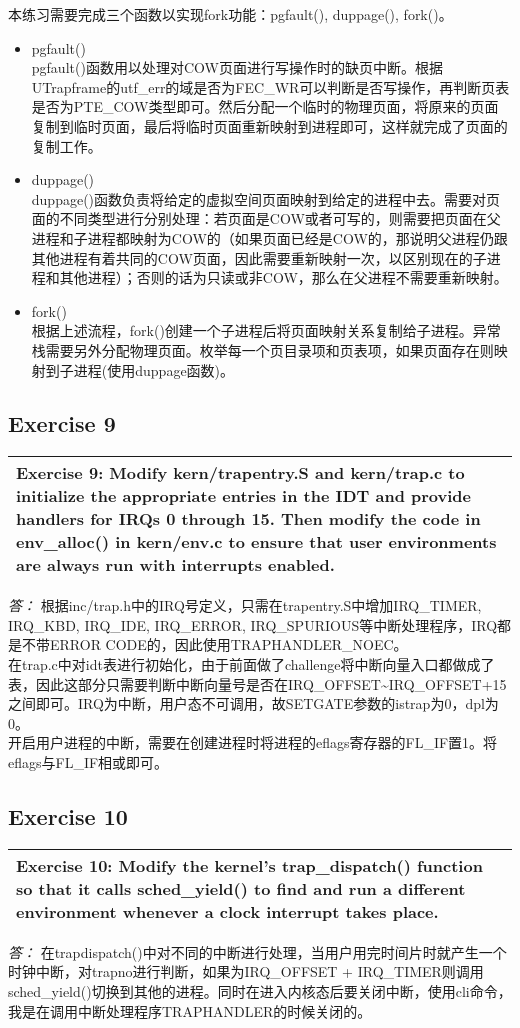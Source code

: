 \documentclass[11pt,a4paper]{article}
\newcommand{\exercise}[2]{
\begin{tabular}{|p{\textwidth}|}
\hline
#1: #2\\
\hline
\end{tabular}
\textit{\large{答：}}}
\begin{document}
本练习需要完成三个函数以实现fork功能：pgfault(), duppage(), fork()。
\begin{itemize}
\item pgfault()\\
pgfault()函数用以处理对COW页面进行写操作时的缺页中断。根据UTrapframe的utf\_err的域是否为FEC\_WR可以判断是否写操作，再判断页表是否为PTE\_COW类型即可。然后分配一个临时的物理页面，将原来的页面复制到临时页面，最后将临时页面重新映射到进程即可，这样就完成了页面的复制工作。
\item duppage()\\
duppage()函数负责将给定的虚拟空间页面映射到给定的进程中去。需要对页面的不同类型进行分别处理：若页面是COW或者可写的，则需要把页面在父进程和子进程都映射为COW的（如果页面已经是COW的，那说明父进程仍跟其他进程有着共同的COW页面，因此需要重新映射一次，以区别现在的子进程和其他进程）；否则的话为只读或非COW，那么在父进程不需要重新映射。
\item fork()\\
根据上述流程，fork()创建一个子进程后将页面映射关系复制给子进程。异常栈需要另外分配物理页面。枚举每一个页目录项和页表项，如果页面存在则映射到子进程(使用duppage函数)。\\
\end{itemize}

\subsection{Exercise 9}
\exercise{Exercise 9}{Modify kern/trapentry.S and kern/trap.c to initialize the appropriate entries in the IDT and provide handlers for IRQs 0 through 15. Then modify the code in env\_alloc() in kern/env.c to ensure that user environments are always run with interrupts enabled.}
根据inc/trap.h中的IRQ号定义，只需在trapentry.S中增加IRQ\_TIMER, IRQ\_KBD, IRQ\_IDE, IRQ\_ERROR, IRQ\_SPURIOUS等中断处理程序，IRQ都是不带ERROR CODE的，因此使用TRAPHANDLER\_NOEC。\\
在trap.c中对idt表进行初始化，由于前面做了challenge将中断向量入口都做成了表，因此这部分只需要判断中断向量号是否在IRQ\_OFFSET\~{}IRQ\_OFFSET+15之间即可。IRQ为中断，用户态不可调用，故SETGATE参数的istrap为0，dpl为0。\\
开启用户进程的中断，需要在创建进程时将进程的eflags寄存器的FL\_IF置1。将eflags与FL\_IF相或即可。\\

\subsection{Exercise 10}
\exercise{Exercise 10}{Modify the kernel's trap\_dispatch() function so that it calls sched\_yield()  to find and run a different environment whenever a clock interrupt takes place. }
在trapdispatch()中对不同的中断进行处理，当用户用完时间片时就产生一个时钟中断，对trapno进行判断，如果为IRQ\_OFFSET + IRQ\_TIMER则调用sched\_yield()切换到其他的进程。同时在进入内核态后要关闭中断，使用cli命令，我是在调用中断处理程序TRAPHANDLER的时候关闭的。
\end{document}
